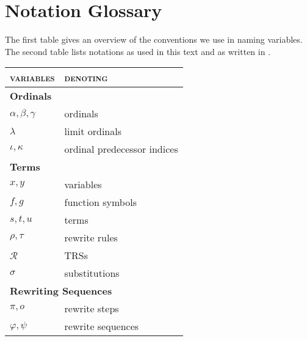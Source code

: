 \chapter{Notation Glossary}\label{chap:glossary}


The first table gives an overview of the conventions we use in naming
variables. The second table lists notations as used in this text and
as written in \Coq.
\begin{center}
{\renewcommand{\arraystretch}{1.1}
\renewcommand{\tabcolsep}{10pt}
\begin{tabular}{p{130pt} p{130pt}}
\textsc{variables} & \textsc{denoting}\\
\hline
\multicolumn{2}{l}{\bf Ordinals}\\
$\alpha, \beta, \gamma$ & ordinals\\
$\lambda$ & limit ordinals\\
$\iota, \kappa$ & ordinal predecessor indices\\
\multicolumn{2}{l}{\bf Terms}\\
$x, y$ & variables\\
$f, g$ & function symbols\\
$s, t, u$ & terms\\
$\rho, \tau$ & rewrite rules\\
$\mathcal{R}$ & TRSs\\
$\sigma$ & substitutions\\
\multicolumn{2}{l}{\bf Rewriting Sequences}\\
$\pi, o$ & rewrite steps\\
$\varphi, \psi$ & rewrite sequences\\
\end{tabular}}
\end{center}


